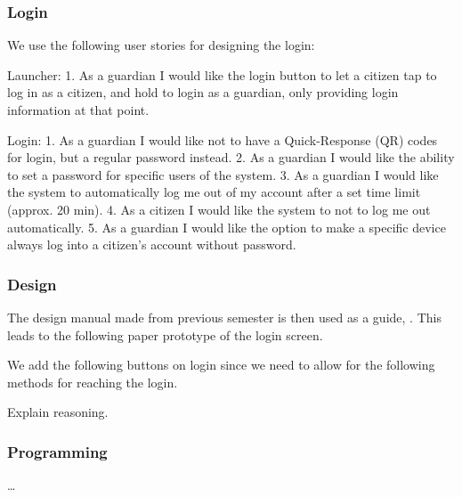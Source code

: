 \subsubsection{Login}

We use the following user stories for designing the login:

Launcher:
1. As a guardian I would like the login button to let a citizen tap to log in as
a citizen, and hold to login as a guardian, only providing login information at that point.

Login:
1. As a guardian I would like not to have a Quick-Response (QR) codes for login,
but a regular password instead.
2. As a guardian I would like the ability to set a password for specific users
of the system.
3. As a guardian I would like the system to automatically log me out of my
account after a set time limit (approx. 20 min).
4. As a citizen I would like the system to not to log me out automatically.
5. As a guardian I would like the option to make a specific device always log
into a citizen's account without password.

\subsubsection{Design}

The design manual made from previous semester is then used as a guide,
. This leads to the following paper
prototype of the login screen.


We add the following buttons on login since we need to allow for the
following methods for reaching the login.


Explain reasoning.

\subsubsection{Programming}

\ldots

